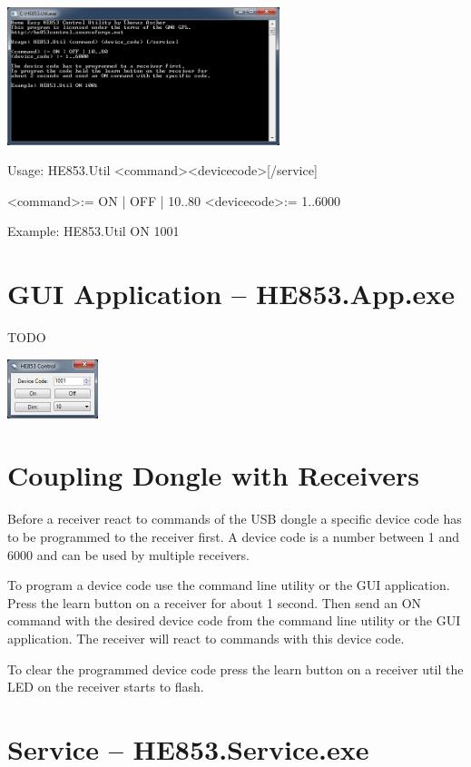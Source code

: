 \documentclass[
a4paper,
oneside,
halfparskip*,
normalheadings,
]
{scrbook}
\begin{document}
\includegraphics[width=300px]{cmd.png}

Usage: HE853.Util \textless command\textgreater \textless device\textunderscore code\textgreater [/service]

\textless command\textgreater := ON | OFF | 10..80
\textless device\textunderscore code\textgreater := 1..6000

Example: HE853.Util ON 1001

\section{GUI Application -- HE853.App.exe}

TODO

\includegraphics[width=100px]{gui.png}


\section{Coupling Dongle with Receivers}

Before a receiver react to commands of the USB dongle a specific device code has to be
programmed to the receiver first. A device code is a number between 1 and 6000 and can
be used by multiple receivers.

To program a device code use the command line utility or the GUI application. Press the
learn button on a receiver for about 1 second. Then send an ON command with the desired
device code from the command line utility or the GUI application. The receiver will
react to commands with this device code.

To clear the programmed device code press the learn button on a receiver util the LED
on the receiver starts to flash.

\section{Service -- HE853.Service.exe}
\end{document}
